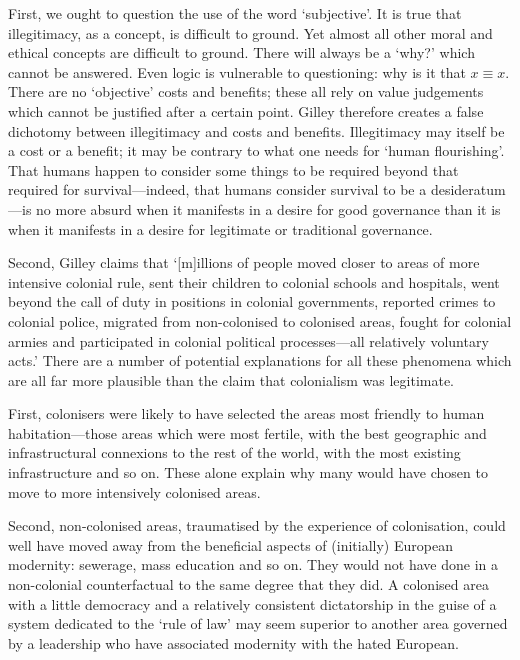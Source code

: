 \begin{multicols}{2}
First, we ought to question the use of the word `subjective'. It is true that illegitimacy, as a concept, is difficult to ground. Yet almost all other moral and ethical concepts are difficult to ground. There will always be a `why?' which cannot be answered. Even logic is vulnerable to questioning: why is it that \(x \equiv x\). There are no `objective' costs and benefits; these all rely on value judgements which cannot be justified after a certain point. Gilley therefore creates a false dichotomy between illegitimacy and costs and benefits. Illegitimacy may itself be a cost or a benefit; it may be contrary to what one needs for `human flourishing'. That humans happen to consider some things to be required beyond that required for survival---indeed, that humans consider survival to be a desideratum---is no more absurd when it manifests in a desire for good governance than it is when it manifests in a desire for legitimate or traditional governance.

Second, Gilley claims that `[m]illions of people moved closer to areas of more intensive colonial rule, sent their children to colonial schools and hospitals, went beyond the call of duty in positions in colonial governments, reported crimes to colonial police, migrated from non-colonised to colonised areas, fought for colonial armies and participated in colonial political processes---all relatively voluntary acts.' There are a number of potential explanations for all these phenomena which are all far more plausible than the claim that colonialism was legitimate.

First, colonisers were likely to have selected the areas most friendly to human habitation---those areas which were most fertile, with the best geographic and infrastructural connexions to the rest of the world, with the most existing infrastructure and so on. These alone explain why many would have chosen to move to more intensively colonised areas.

Second, non-colonised areas, traumatised by the experience of colonisation, could well have moved away from the beneficial aspects of (initially) European modernity: sewerage, mass education and so on. They would not have done in a non-colonial counterfactual to the same degree that they did. A colonised area with a little democracy and a relatively consistent dictatorship in the guise of a system dedicated to the `rule of law' may seem superior to another area governed by a leadership who have associated modernity with the hated European.


\end{multicols}
